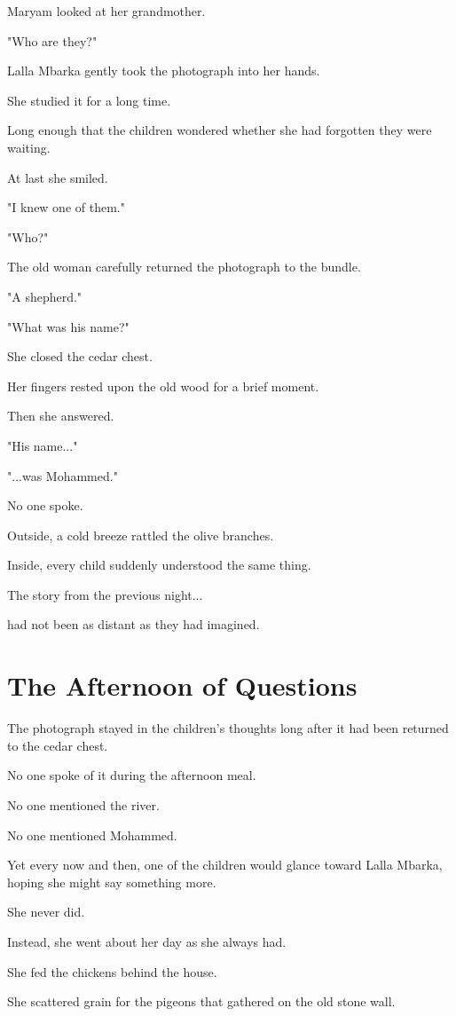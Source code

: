 \documentclass[12pt,openany]{book}
\begin{document}
Maryam looked at her grandmother.

"Who are they?"

Lalla Mbarka gently took the photograph into her hands.

She studied it for a long time.

Long enough that the children wondered whether she had forgotten they were waiting.

At last she smiled.

"I knew one of them."

"Who?"

The old woman carefully returned the photograph to the bundle.

"A shepherd."

"What was his name?"

She closed the cedar chest.

Her fingers rested upon the old wood for a brief moment.

Then she answered.

"His name..."

"...was Mohammed."

No one spoke.

Outside, a cold breeze rattled the olive branches.

Inside, every child suddenly understood the same thing.

The story from the previous night...

had not been as distant as they had imagined.
\section*{The Afternoon of Questions}

The photograph stayed in the children's thoughts long after it had been returned to the cedar chest.

No one spoke of it during the afternoon meal.

No one mentioned the river.

No one mentioned Mohammed.

Yet every now and then, one of the children would glance toward Lalla Mbarka, hoping she might say something more.

She never did.

Instead, she went about her day as she always had.

She fed the chickens behind the house.

She scattered grain for the pigeons that gathered on the old stone wall.
\end{document}

